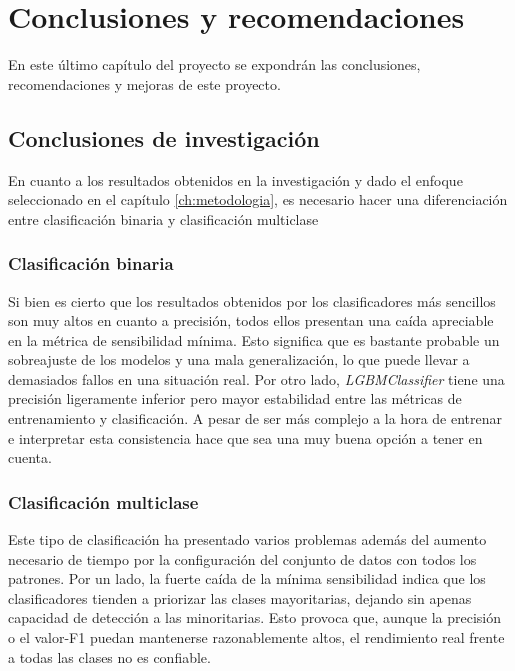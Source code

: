 \chapter{Conclusiones y recomendaciones}
\label{ch:conclusiones}

En este último capítulo del proyecto se expondrán las conclusiones, recomendaciones y mejoras de este proyecto.

\section{Conclusiones de investigación}
\label{sec:conc_investigacion}

En cuanto a los resultados obtenidos en la investigación y dado el enfoque seleccionado en el capítulo \ref{ch:metodologia}, es necesario hacer una diferenciación entre clasificación binaria y clasificación multiclase

\subsection{Clasificación binaria}
\label{subsec:conc_bin}

Si bien es cierto que los resultados obtenidos por los clasificadores más sencillos son muy altos en cuanto a precisión, todos ellos presentan una caída apreciable en la métrica de sensibilidad mínima. Esto significa que es bastante probable un sobreajuste de los modelos y una mala generalización, lo que puede llevar a demasiados fallos en una situación real. Por otro lado, \textit{LGBMClassifier} tiene una precisión ligeramente inferior pero mayor estabilidad entre las métricas de entrenamiento y clasificación. A pesar de ser más complejo a la hora de entrenar e interpretar esta consistencia hace que sea una muy buena opción a tener en cuenta.

\subsection{Clasificación multiclase}
\label{subsec:conc_multi}

Este tipo de clasificación ha presentado varios problemas además del aumento necesario de tiempo por la configuración del conjunto de datos con todos los patrones. Por un lado, la fuerte caída de la mínima sensibilidad indica que los clasificadores tienden a priorizar las clases mayoritarias, dejando sin apenas capacidad de detección a las minoritarias. Esto provoca que, aunque la precisión o el valor-F1 puedan mantenerse razonablemente altos, el rendimiento real frente a todas las clases no es confiable.

